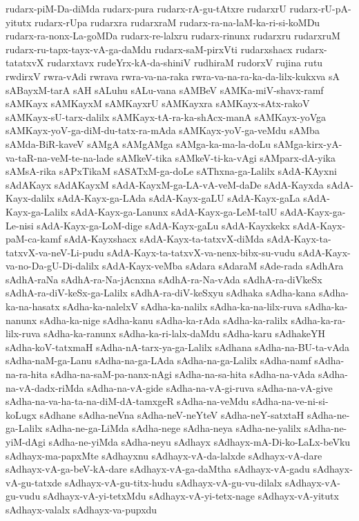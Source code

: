 {rudarx-piM-Da-diMda
rudarx-pura
rudarx-rA-gu-tAtxre
rudarxrU
rudarx-rU-pA-yitutx
rudarx-rUpa
rudarxra
rudarxraM
rudarx-ra-na-laM-ka-ri-si-koMDu
rudarx-ra-nonx-La-goMDa
rudarx-re-lalxru
rudarx-rinunx
rudarxru
rudarxruM
rudarx-ru-tapx-tayx-vA-ga-daMdu
rudarx-saM-pirxVti
rudarxshacx
rudarx-tatatxvX
rudarxtavx
rudeYrx-kA-da-shiniV
rudhiraM
rudorxV
rujina
rutu
rwdirxV
rwra-vAdi
rwrava
rwra-va-na-raka
rwra-va-na-ra-ka-da-lilx-kukxva
sA
sABayxM-tarA
sAH
sALuhu
sALu-vana
sAMBeV
sAMKa-miV-shavx-ramf
sAMKayx
sAMKayxM
sAMKayxrU
sAMKayxra
sAMKayx-sAtx-rakoV
sAMKayx-sU-tarx-dalilx
sAMKayx-tA-ra-ka-shAcx-manA
sAMKayx-yoVga
sAMKayx-yoV-ga-diM-du-tatx-ra-mAda
sAMKayx-yoV-ga-veMdu
sAMba
sAMda-BiR-kaveV
sAMgA
sAMgAMga
sAMga-ka-ma-la-doLu
sAMga-kirx-yA-va-taR-na-veM-te-na-lade
sAMkeV-tika
sAMkeV-ti-ka-vAgi
sAMparx-dA-yika
sAMsA-rika
sAPxTikaM
sASATxM-ga-doLe
sAThxna-ga-Lalilx
sAdA-KAyxni
sAdAKayx
sAdAKayxM
sAdA-KayxM-ga-LA-vA-veM-daDe
sAdA-Kayxda
sAdA-Kayx-dalilx
sAdA-Kayx-ga-LAda
sAdA-Kayx-gaLU
sAdA-Kayx-gaLa
sAdA-Kayx-ga-Lalilx
sAdA-Kayx-ga-Lanunx
sAdA-Kayx-ga-LeM-talU
sAdA-Kayx-ga-Le-nisi
sAdA-Kayx-ga-LoM-dige
sAdA-Kayx-gaLu
sAdA-Kayxkekx
sAdA-Kayx-paM-ca-kamf
sAdA-Kayxshacx
sAdA-Kayx-ta-tatxvX-diMda
sAdA-Kayx-ta-tatxvX-va-neV-Li-pudu
sAdA-Kayx-ta-tatxvX-va-nenx-bibx-su-vudu
sAdA-Kayx-va-no-Da-gU-Di-dalilx
sAdA-Kayx-veMba
sAdara
sAdaraM
sAde-rada
sAdhAra
sAdhA-raNa
sAdhA-ra-Na-jAcnxna
sAdhA-ra-Na-vAda
sAdhA-ra-diVkeSx
sAdhA-ra-diV-keSx-ga-Lalilx
sAdhA-ra-diV-keSxyu
sAdhaka
sAdha-kana
sAdha-ka-na-hasatx
sAdha-ka-nalelxV
sAdha-ka-nalilx
sAdha-ka-na-lilx-ruva
sAdha-ka-nanunx
sAdha-ka-nige
sAdha-kanu
sAdha-ka-rAda
sAdha-ka-ralilx
sAdha-ka-ra-lilx-ruva
sAdha-ka-ranunx
sAdha-ka-ri-lalx-daMdu
sAdha-karu
sAdhakeYH
sAdha-koV-tatxmaH
sAdha-nA-tarx-ya-ga-Lalilx
sAdhana
sAdha-na-BU-ta-vAda
sAdha-naM-ga-Lanu
sAdha-na-ga-LAda
sAdha-na-ga-Lalilx
sAdha-namf
sAdha-na-ra-hita
sAdha-na-saM-pa-nanx-nAgi
sAdha-na-sa-hita
sAdha-na-vAda
sAdha-na-vA-dadx-riMda
sAdha-na-vA-gide
sAdha-na-vA-gi-ruva
sAdha-na-vA-give
sAdha-na-va-ha-ta-na-diM-dA-tamxgeR
sAdha-na-veMdu
sAdha-na-ve-ni-si-koLugx
sAdhane
sAdha-neVna
sAdha-neV-neYteV
sAdha-neY-satxtaH
sAdha-ne-ga-Lalilx
sAdha-ne-ga-LiMda
sAdha-nege
sAdha-neya
sAdha-ne-yalilx
sAdha-ne-yiM-dAgi
sAdha-ne-yiMda
sAdha-neyu
sAdhayx
sAdhayx-mA-Di-ko-LaLx-beVku
sAdhayx-ma-papxMte
sAdhayxnu
sAdhayx-vA-da-lalxde
sAdhayx-vA-dare
sAdhayx-vA-ga-beV-kA-dare
sAdhayx-vA-ga-daMtha
sAdhayx-vA-gadu
sAdhayx-vA-gu-tatxde
sAdhayx-vA-gu-titx-hudu
sAdhayx-vA-gu-vu-dilalx
sAdhayx-vA-gu-vudu
sAdhayx-vA-yi-tetxMdu
sAdhayx-vA-yi-tetx-nage
sAdhayx-vA-yitutx
sAdhayx-valalx
sAdhayx-va-pupxdu
}
